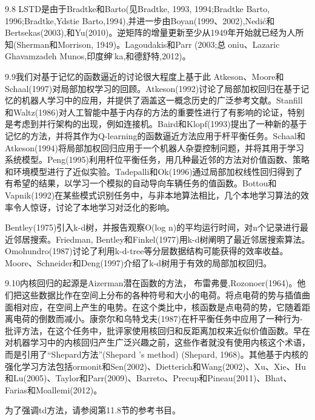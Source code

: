 {9.8 LSTD是由于Bradtke和Barto(见Bradtke, 1993, 1994;Bradtke Barto,
1996;Bradtke,Ydstie Barto,1994),并进一步由Boyan(1999、2002),Nedić和Bertsekas(2003),和Yu(2010)。逆矩阵的增量更新至少从1949年开始就已经为人所知(Sherman和Morrison, 1949)。Lagoudakis和Parr (2003;总线̧oniu、Lazaric Ghavamzadeh Munos,印度绅士̆ka,和德舒特,2012)。

9.9我们对基于记忆的函数逼近的讨论很大程度上基于此
Atkeson、Moore和Schaal(1997)对局部加权学习的回顾。Atkeson(1992)讨论了局部加权回归在基于记忆的机器人学习中的应用，并提供了涵盖这一概念历史的广泛参考文献。Stanfill和Waltz(1986)对人工智能中基于内存的方法的重要性进行了有影响的论证，特别是考虑到并行架构的出现，例如连接机。Baird和Klopf(1993)提出了一种新的基于记忆的方法，并将其作为Q-learning的函数逼近方法应用于杆平衡任务。Schaal和Atkeson(1994)将局部加权回归应用于一个机器人杂耍控制问题，并将其用于学习系统模型。Peng(1995)利用杆位平衡任务，用几种最近邻的方法对价值函数、策略和环境模型进行了近似实验。Tadepalli和Ok(1996)通过局部加权线性回归得到了有希望的结果，以学习一个模拟的自动导向车辆任务的值函数。Bottou和Vapnik(1992)在某些模式识别任务中，与非本地算法相比，几个本地学习算法的效率令人惊讶，讨论了本地学习对泛化的影响。

Bentley(1975)引入k-d树，并报告观察O(log n)的平均运行时间，对n个记录进行最近邻居搜索。Friedman, Bentley和Finkel(1977)用k-d树阐明了最近邻居搜索算法。Omohundro(1987)讨论了利用k-d-tree等分层数据结构可能获得的效率收益。Moore、Schneider和Deng(1997)介绍了k-d树用于有效的局部加权回归。


9.10内核回归的起源是Aizerman潜在函数的方法，
布雷弗曼,Rozonoer(1964)。他们把这些数据比作在空间上分布的各种符号和大小的电荷。将点电荷的势与插值曲面相对应，在空间上产生的电势。在这个类比中，核函数是点电荷的势，它随着距离电荷的倒数而减小。康奈尔和乌特戈夫(1987)在杆平衡任务中应用了一种行为-批评方法，在这个任务中，批评家使用核回归和反距离加权来近似价值函数。早在对机器学习中的内核回归产生广泛兴趣之前，这些作者就没有使用内核这个术语，而是引用了“Shepard方法”(Shepard 's method) (Shepard, 1968)。其他基于内核的强化学习方法包括ormonit和Sen(2002)、Dietterich和Wang(2002)、Xu、Xie、Hu和Lu(2005)、Taylor和Parr(2009)、Barreto、Precup和Pineau(2011)、Bhat、Farias和Moallemi(2012)。

为了强调td方法，请参阅第11.8节的参考书目。

}
